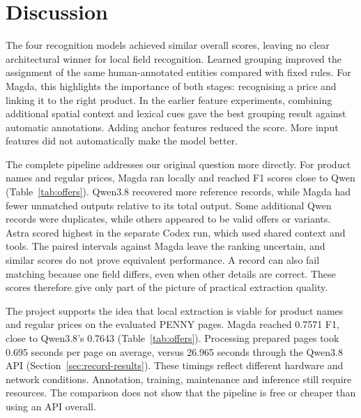 \section{Discussion}\label{sec:discussion}
The four recognition models achieved similar overall scores, leaving no clear architectural winner for local field recognition. Learned grouping improved the assignment of the same human-annotated entities compared with fixed rules. For Magda, this highlights the importance of both stages: recognising a price and linking it to the right product. In the earlier feature experiments, combining additional spatial context and lexical cues gave the best grouping result against automatic annotations. Adding anchor features reduced the score. More input features did not automatically make the model better.

The complete pipeline addresses our original question more directly. For product names and regular prices, Magda ran locally and reached F1 scores close to Qwen (Table~\ref{tab:offers}). Qwen3.8 recovered more reference records, while Magda had fewer unmatched outputs relative to its total output. Some additional Qwen records were duplicates, while others appeared to be valid offers or variants. Astra scored highest in the separate Codex run, which used shared context and tools. The paired intervals against Magda leave the ranking uncertain, and similar scores do not prove equivalent performance. A record can also fail matching because one field differs, even when other details are correct. These scores therefore give only part of the picture of practical extraction quality.

The project supports the idea that local extraction is viable for product names and regular prices on the evaluated PENNY pages. Magda reached 0.7571 F1, close to Qwen3.8's 0.7643 (Table~\ref{tab:offers}). Processing prepared pages took 0.695 seconds per page on average, versus 26.965 seconds through the Qwen3.8 API (Section~\ref{sec:record-results}). These timings reflect different hardware and network conditions. Annotation, training, maintenance and inference still require resources. The comparison does not show that the pipeline is free or cheaper than using an API overall.
